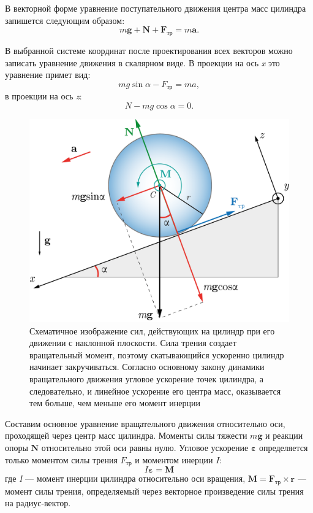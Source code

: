 \documentclass[All.tex]{subfiles}
\begin{document}
	В векторной форме уравнение поступательного движения центра масс цилиндра запишется следующим образом:
	\begin{equation}\label{inclinedplane-1eq1}
	m\textbf{g}+\textbf{N}+\textbf{F}_{\text{тр}} = m\textbf{a}.
	\end{equation} 
	
В выбранной системе координат после проектирования всех векторов можно записать уравнение движения в скалярном виде.
В проекции на ось  \textit{x}  это уравнение примет вид:
	\begin{equation}\label{inclinedplane-1eq2}
	mg\sin\alpha - F_{\text{тр}} = ma,
	\end{equation}
	в проекции на ось  \textit{z}:
	\begin{equation}\label{inclinedplane-1eq3}
	N - mg\cos\alpha = 0.
	\end{equation}
	
		\begin{figure}[H] 	
		\centering 	
		\includegraphics[width=0.6\linewidth]{inclinedplane-3.png}
		\caption{Схематичное изображение сил, действующих на цилиндр при его движении с наклонной плоскости. Сила трения создает вращательный момент, поэтому скатывающийся ускоренно цилиндр начинает закручиваться. Согласно основному закону динамики вращательного движения угловое ускорение точек цилиндра, а следовательно, и линейное ускорение его центра масс, оказывается тем больше, чем меньше его момент инерции}
		\label{inclinedplane-3}
	\end{figure}

	Составим основное уравнение вращательного движения относительно оси, проходящей через центр масс цилиндра. 
	Моменты силы тяжести  $	m\textbf{g} $ и реакции опоры $ \textbf{N} $ относительно этой оси равны нулю. 
	Угловое ускорение $ \textbf{ε} $ определяется только моментом силы трения $ F_{\text{тр}} $ и моментом инерции $ I $:
	\begin{equation}\label{inclinedplane-1eq4}
	 I\textbf{ε}=\textbf{M}
	\end{equation}
	где \textit{I} — момент инерции цилиндра относительно оси вращения, \linebreak $ \textbf{M} = \textbf{F}_{\text{тр}}\times \textbf{r} $ — момент силы трения, определяемый через векторное произведение силы трения на радиус-вектор.
	
\end{document}
